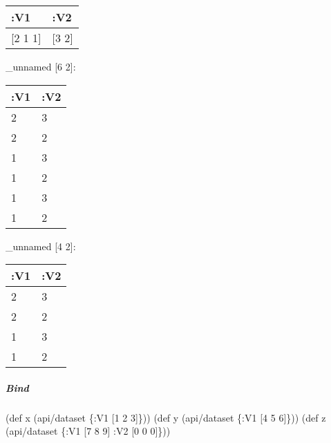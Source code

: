 \documentclass[]{article}
\newenvironment{Shaded}{\begin{snugshade}}{\end{snugshade}}
\newcommand{\AttributeTok}[1]{\textcolor[rgb]{0.77,0.63,0.00}{#1}}
\newcommand{\BuiltInTok}[1]{#1}
\newcommand{\DecValTok}[1]{\textcolor[rgb]{0.00,0.00,0.81}{#1}}
\newcommand{\FunctionTok}[1]{\textcolor[rgb]{0.00,0.00,0.00}{#1}}
\newcommand{\KeywordTok}[1]{\textcolor[rgb]{0.13,0.29,0.53}{\textbf{#1}}}
\newcommand{\NormalTok}[1]{#1}
\newcommand{\VariableTok}[1]{\textcolor[rgb]{0.00,0.00,0.00}{#1}}
\let\oldsubparagraph\subparagraph
\renewcommand{\subparagraph}[1]{\oldsubparagraph{#1}\mbox{}}
\begin{document}
\begin{longtable}[]{@{}ll@{}}
\toprule
:V1 & :V2\tabularnewline
\midrule
\endhead
{[}2 1 1{]} & {[}3 2{]}\tabularnewline
\bottomrule
\end{longtable}

\begin{Shaded}
\end{Shaded}

\_unnamed {[}6 2{]}:

\begin{longtable}[]{@{}ll@{}}
\toprule
:V1 & :V2\tabularnewline
\midrule
\endhead
2 & 3\tabularnewline
2 & 2\tabularnewline
1 & 3\tabularnewline
1 & 2\tabularnewline
1 & 3\tabularnewline
1 & 2\tabularnewline
\bottomrule
\end{longtable}

\begin{Shaded}
\end{Shaded}

\_unnamed {[}4 2{]}:

\begin{longtable}[]{@{}ll@{}}
\toprule
:V1 & :V2\tabularnewline
\midrule
\endhead
2 & 3\tabularnewline
2 & 2\tabularnewline
1 & 3\tabularnewline
1 & 2\tabularnewline
\bottomrule
\end{longtable}

\hypertarget{bind-1}{%
\subparagraph{Bind}\label{bind-1}}

\begin{Shaded}
\begin{Highlighting}[]
\NormalTok{(}\BuiltInTok{def}\FunctionTok{ x }\NormalTok{(api/dataset \{}\AttributeTok{:V1}\NormalTok{ [}\DecValTok{1} \DecValTok{2} \DecValTok{3}\NormalTok{]\}))}
\NormalTok{(}\BuiltInTok{def}\FunctionTok{ y }\NormalTok{(api/dataset \{}\AttributeTok{:V1}\NormalTok{ [}\DecValTok{4} \DecValTok{5} \DecValTok{6}\NormalTok{]\}))}
\NormalTok{(}\BuiltInTok{def}\FunctionTok{ z }\NormalTok{(api/dataset \{}\AttributeTok{:V1}\NormalTok{ [}\DecValTok{7} \DecValTok{8} \DecValTok{9}\NormalTok{]}
                     \AttributeTok{:V2}\NormalTok{ [}\DecValTok{0} \DecValTok{0} \DecValTok{0}\NormalTok{]\}))}
\end{Highlighting}
\end{Shaded}
\end{document}

